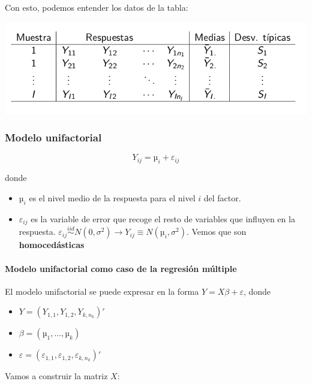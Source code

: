 Con esto, podemos entender los datos de la tabla:

\begin{center}
\includegraphics[scale=0.6]{img/ModeloUnifactorial.png}
\end{center}


\subsubsection{Modelo unifactorial}

\[Y_{ij} = µ_i + ε_{ij}\]

donde
\begin{itemize}
	\item $µ_i$ es el nivel medio de la respuesta para el nivel $i$ del factor.
	\item $ε_{ij}$ es la variable de error que recoge el resto de variables que
influyen en la respuesta.
	\subitem $ε_{ij} \overset{iid}{\sim} N(0,σ^2) \to Y_{ij} \equiv N(µ_i,σ^2)$.
	\subitem Vemos que son \textbf{homocedásticas}
\end{itemize}

\paragraph{Modelo unifactorial como caso de la regresión múltiple}

El modelo unifactorial se puede expresar en la forma $Y = Xβ + ε$,
donde

\begin{itemize}
	\item $Y=(Y_{1,1},Y_{1,2},Y_{k,n_k})'$
	\item $β = (µ_1,...,µ_k)$
	\item $ε=(ε_{1,1},ε_{1,2},ε_{k,n_k})'$
\end{itemize}

Vamos a construir la matriz $X$:

